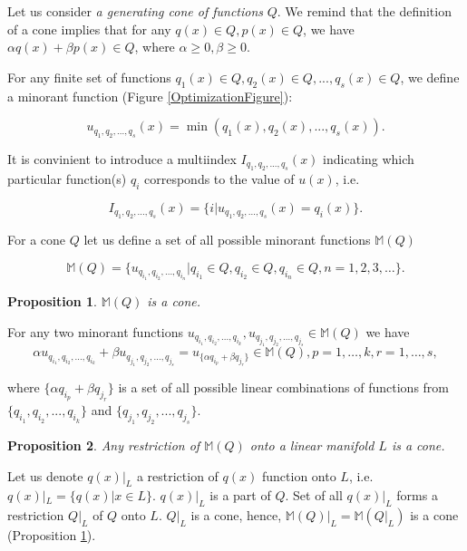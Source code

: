 \documentclass[preprint,12pt]{elsarticle}
\newtheorem{prop}{Proposition}
\newenvironment{proof}[1][Proof]{\begin{trivlist}
\item[\hskip \labelsep {\bfseries #1}]}{\end{trivlist}}
\begin{document}
Let us consider {\it a generating cone of functions} $Q$. We remind that the definition of a cone implies that for any $q(x)\in Q, p(x)\in Q$, we have $\alpha q(x)+\beta p(x)\in Q$, where $\alpha\geq 0, \beta \geq 0$.

For any finite set of functions ${q_1(x)\in Q, q_2(x)\in Q,..., q_s(x)\in Q}$, we define a minorant function (Figure \ref{OptimizationFigure}):

\begin{equation}\label{minorant}
u_{q_1,q_2,...,q_s}(x) = \min(q_1(x),q_2(x),...,q_s(x)).
\end{equation}

It is convinient to introduce a multiindex $I_{q_1,q_2,...,q_s}(x)$ indicating which particular function(s) $q_i$ corresponds to the value of $u(x)$, i.e.

\begin{equation}\label{minorant_index}
I_{q_1,q_2,...,q_s}(x) = \{i|u_{q_1,q_2,...,q_s}(x)=q_i(x)\}.
\end{equation}

For a cone $Q$ let us define a set of all possible minorant functions $\mathbb{M}(Q)$

\begin{equation}\label{minorant_index}
\mathbb{M}(Q) = \{ u_{q_{i_1},q_{i_2},...,q_{i_n}} | q_{i_1}\in Q, q_{i_2}\in Q, q_{i_n}\in Q, n = 1,2,3,\dots \}.
\end{equation}

\begin{prop}\label{Misacone}
$\mathbb{M}(Q)$ is a cone.
\end{prop}
\begin{proof}
For any two minorant functions $u_{q_{i_1},q_{i_2},...,q_{i_k}}, u_{q_{j_1},q_{j_2},...,q_{j_s}}\in \mathbb{M}(Q)$ we have
$$
\alpha u_{q_{i_1},q_{i_2},...,q_{i_k}} + \beta u_{q_{j_1},q_{j_2},...,q_{j_s}} = u_{\{\alpha q_{i_p}+\beta q_{j_r}\}} \in \mathbb{M}(Q), p=1,\dots,k, r=1,\dots,s,
$$

\noindent where ${\{\alpha q_{i_p}+\beta q_{j_r}\}}$ is a set of all possible linear combinations of functions from $\{q_{i_1},q_{i_2},...,q_{i_k}\}$ and $\{q_{j_1},q_{j_2},...,q_{j_s}\}$.
\end{proof}

\begin{prop}\label{Mrestrictedisacone}
Any restriction of $\mathbb{M}(Q)$ onto a linear manifold $L$ is a cone.
\end{prop}
\begin{proof}
Let us denote $q(x)|_L$ a restriction of $q(x)$ function onto $L$, i.e. $q(x)|_L = \{q(x)|x\in L\}$. $q(x)|_L$ is a part of $Q$.
Set of all $q(x)|_L$ forms a restriction $Q|_L$ of $Q$ onto $L$. $Q|_L$ is a cone, hence, $\mathbb{M}(Q)|_L = \mathbb{M}(Q|_L)$ is a cone (Proposition \ref{Misacone}).
\end{proof}
\end{document}
